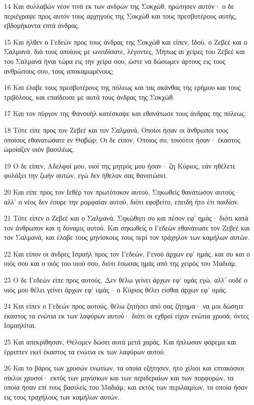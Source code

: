 \par 14 Και συλλαβών νέον τινά εκ των ανδρών της Σοκχώθ, ηρώτησεν αυτόν· ο δε περιέγραψε προς αυτόν τους αρχηγούς της Σοκχώθ και τους πρεσβυτέρους αυτής, εβδομήκοντα επτά άνδρας.
\par 15 Και ήλθεν ο Γεδεών προς τους άνδρας της Σοκχώθ και είπεν, Ιδού, ο Ζεβεέ και ο Σαλμανά, διά τους οποίους με ωνειδίσατε, λέγοντες, Μήπως αι χείρες του Ζεβεέ και του Σαλμανά ήναι τώρα εις την χείρα σου, ώστε να δώσωμεν άρτους εις τους ανθρώπους σου, τους αποκαμωμένους;
\par 16 Και έλαβε τους πρεσβυτέρους της πόλεως και τας ακάνθας της ερήμου και τους τριβόλους, και επαίδευσε με αυτά τους άνδρας της Σοκχώθ.
\par 17 Και τον πύργον της Φανουήλ κατέσκαψε και εθανάτωσε τους άνδρας της πόλεως.
\par 18 Τότε είπε προς τον Ζεβεέ και τον Σαλμανά, Οποίοι ήσαν οι άνθρωποι τους οποίους εθανατώσατε εν Θαβώρ; Οι δε είπον, Οποίος συ, τοιούτοι ήσαν· έκαστος ώμοίαζεν υιόν βασιλέως.
\par 19 Ο δε είπεν, Αδελφοί μου, υιοί της μητρός μου ήσαν· ζη Κύριος, εάν ηθέλετε φυλάξει την ζωήν αυτών, εγώ δεν ήθελον σας θανατώσει.
\par 20 Και είπε προς τον Ιεθέρ τον πρωτότοκον αυτού, Σηκωθείς θανάτωσον αυτούς· αλλ' ο νέος δεν έσυρε την ρομφαίαν αυτού, διότι εφοβείτο, επειδή ήτο έτι παιδίον.
\par 21 Τότε είπεν ο Ζεβεέ και ο Σαλμανά, Σηκώθητι συ και πέσον εφ' ημάς· διότι κατά τον άνθρωπον και η δύναμις αυτού. Και σηκωθείς ο Γεδεών εθανάτωσε τον Ζεβεέ και τον Σαλμανά, και έλαβε τους μηνίσκους τους περί τον τράχηλον των καμήλων αυτών.
\par 22 Και είπον οι άνδρες Ισραήλ προς τον Γεδεών, Γενού άρχων εφ' ημάς, και συ και ο υιός σου και ο υιός του υιού σου, διότι έσωσας ημάς από της χειρός του Μαδιάμ.
\par 23 Ο δε Γεδεών είπε προς αυτούς, Δεν θέλω γείνει άρχων εφ' υμάς εγώ, αλλ' ουδέ ο υιός μου θέλει γείνει άρχων εφ' υμάς· ο Κύριος θέλει είσθαι άρχων εφ' υμάς.
\par 24 Και είπεν ο Γεδεών προς αυτούς, θέλω ζητήσει από σας ζήτημα· να μοι δώσητε έκαστος τα ενώτια εκ των λαφύρων αυτού· διότι οι εχθροί είχον ενώτια χρυσά, όντες Ισμαηλίται.
\par 25 Και απεκρίθησαν, Θέλομεν δώσει αυτά μετά χαράς. Και ήπλωσαν φόρεμα και έρριπτεν εκεί έκαστος τα ενώτια εκ των λαφύρων αυτού.
\par 26 Και το βάρος των χρυσών ενωτίων, τα οποία εζήτησεν, ήτο χίλιοι και επτακόσιοι σίκλοι χρυσοί· εκτός των μηνίσκων και των περιδεραίων και των πορφυρών, τα οποία ήσαν επί τους βασιλείς του Μαδιάμ, και εκτός των περιλαιμίων, τα οποία ήσαν εις τους τραχήλους των καμήλων αυτών.

